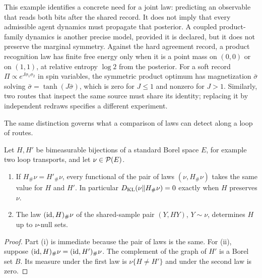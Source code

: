 This example identifies a concrete need for a joint law: predicting an observable that reads both bits after the shared record. It does not imply that every admissible agent dynamics must propagate that posterior. A coupled product-family dynamics is another precise model, provided it is declared, but it does not preserve the marginal symmetry. Against the hard agreement record, a product recognition law has finite free energy only when it is a point mass on $(0,0)$ or on $(1,1)$, at relative entropy $\log2$ from the posterior. For a soft record $\Pi\propto e^{J\sigma_1\sigma_2}$ in spin variables, the symmetric product optimum has magnetization $\bar\sigma$ solving $\bar\sigma=\tanh(J\bar\sigma)$, which is zero for $J\leq1$ and nonzero for $J>1$. Similarly, two routes that inspect the same source must share its identity; replacing it by independent redraws specifies a different experiment.

The same distinction governs what a comparison of laws can detect along a loop of routes.

Let $H,H'$ be bimeasurable bijections of a standard Borel space $E$, for example two loop transports, and let $\nu\in\mathcal P(E)$.
\begin{enumerate}
\item[(i)] If $H_\#\nu=H'_\#\nu$, every functional of the pair of laws $(\nu,H_\#\nu)$ takes the same value for $H$ and $H'$. In particular $D_{\mathrm{KL}}(\nu\Vert H_\#\nu)=0$ exactly when $H$ preserves $\nu$.
\item[(ii)] The law $(\mathrm{id},H)_\#\nu$ of the shared-sample pair $(Y,HY)$, $Y\sim\nu$, determines $H$ up to $\nu$-null sets.
\end{enumerate}
\begin{proof}
Part (i) is immediate because the pair of laws is the same. For (ii), suppose $(\mathrm{id},H)_\#\nu=(\mathrm{id},H')_\#\nu$. The complement of the graph of $H'$ is a Borel set $B$. Its measure under the first law is $\nu\{H\neq H'\}$ and under the second law is zero.
\end{proof}

